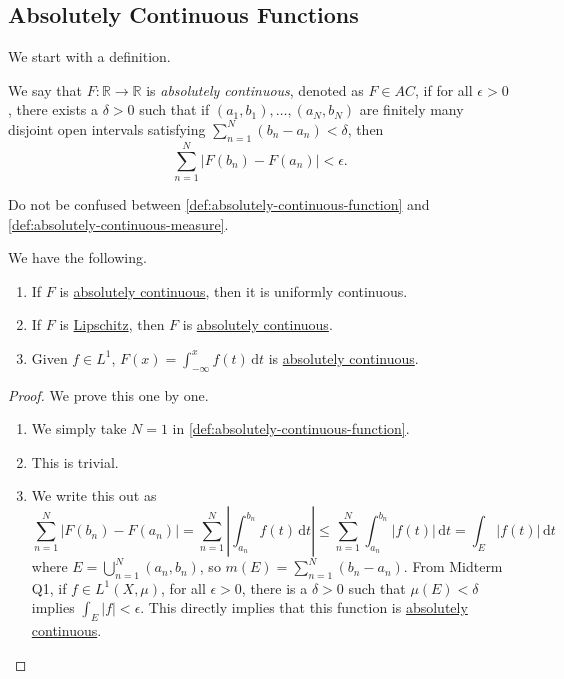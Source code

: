 
\subsection{Absolutely Continuous Functions}
We start with a definition.
\begin{definition}\label{def:absolutely-continuous-function}
	We say that \(F \colon \mathbb{R} \to \mathbb{R}\) is \emph{absolutely continuous}, denoted as \(F \in AC\), if for all \(\epsilon > 0\), there exists a
	\(\delta > 0\) such that if \((a_1,b_1),\dots,(a_N,b_N)\) are finitely many disjoint open intervals satisfying \(\sum_{n=1}^N (b_n-a_n) < \delta\), then
	\[
		\sum_{n=1}^N \left\vert F(b_n) - F(a_n) \right\vert < \epsilon.
	\]
\end{definition}
\begin{note}
	Do not be confused between \autoref{def:absolutely-continuous-function} and \autoref{def:absolutely-continuous-measure}.
\end{note}
\begin{lemma}
	We have the following.
	\begin{enumerate}[(1)]
		\item If \(F\) is \hyperref[def:absolutely-continuous-function]{absolutely continuous}, then it is uniformly continuous.
		\item If \(F\) is \hyperref[def:Lipschitz]{Lipschitz}, then \(F\) is \hyperref[def:absolutely-continuous-function]{absolutely continuous}.
		\item Given \(f \in L^1\), \(F(x) = \int_{-\infty}^x f(t) \,\mathrm{d}t\) is \hyperref[def:absolutely-continuous-function]{absolutely continuous}.
	\end{enumerate}
\end{lemma}
\begin{proof}
	We prove this one by one.
	\begin{enumerate}[(1)]
		\item We simply take \(N = 1\) in \autoref{def:absolutely-continuous-function}.
		\item This is trivial.
		\item We write this out as
		      \[
			      \sum_{n=1}^N \left\vert F(b_n) - F(a_n) \right\vert = \sum_{n=1}^N \left\vert \int_{a_n}^{b_n} f(t) \,\mathrm{d}t \right\vert
			      \leq \sum_{n=1}^N \int_{a_n}^{b_n} \left\vert f(t) \right\vert \,\mathrm{d}t
			      = \int_E \left\vert f(t) \right\vert \,\mathrm{d}t
		      \]
		      where \(E = \bigcup_{n=1}^N (a_n,b_n)\), so \(m(E) = \sum_{n=1}^N (b_n-a_n)\). From Midterm Q1, if \(f \in L^1(X,\mu)\), for all \(\epsilon > 0\),
		      there is a \(\delta > 0\) such that \(\mu(E) < \delta\) implies \(\int_E \left\vert f \right\vert < \epsilon\).
		      This directly implies that this function is \hyperref[def:absolutely-continuous-function]{absolutely continuous}.
	\end{enumerate}
\end{proof}

